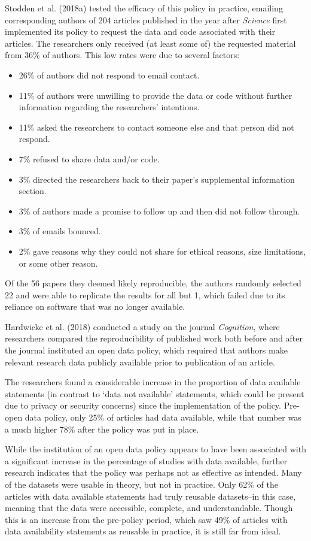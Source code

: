 \documentclass[12pt,twoside]{reedthesis}
\providecommand{\tightlist}{%
  \setlength{\itemsep}{0pt}\setlength{\parskip}{0pt}}
\begin{document}
Stodden et al. (2018a) tested the efficacy of this policy in practice, emailing corresponding authors of 204 articles published in the year after \emph{Science} first implemented its policy to request the data and code associated with their articles. The researchers only received (at least some of) the requested material from 36\% of authors. This low rates were due to several factors:
\begin{itemize}
\tightlist
\item
  26\% of authors did not respond to email contact.
\item
  11\% of authors were unwilling to provide the data or code without further information regarding the researchers' intentions.
\item
  11\% asked the researchers to contact someone else and that person did not respond.
\item
  7\% refused to share data and/or code.
\item
  3\% directed the researchers back to their paper's supplemental information section.
\item
  3\% of authors made a promise to follow up and then did not follow through.
\item
  3\% of emails bounced.
\item
  2\% gave reasons why they could not share for ethical reasons, size limitations, or some other reason.
\end{itemize}
Of the 56 papers they deemed likely reproducible, the authors randomly selected 22 and were able to replicate the results for all but 1, which failed due to its reliance on software that was no longer available.

Hardwicke et al. (2018) conducted a study on the journal \emph{Cognition}, where researchers compared the reproducibility of published work both before and after the journal instituted an open data policy, which required that authors make relevant research data publicly available prior to publication of an article.

The researchers found a considerable increase in the proportion of data available statements (in contrast to `data not available' statements, which could be present due to privacy or security concerns) since the implementation of the policy. Pre-open data policy, only 25\% of articles had data available, while that number was a much higher 78\% after the policy was put in place.

While the institution of an open data policy appears to have been associated with a significant increase in the percentage of studies with data available, further research indicates that the policy was perhaps not as effective as intended. Many of the datasets were usable in theory, but not in practice. Only 62\% of the articles with data available statements had truly reusable datasets--in this case, meaning that the data were accessible, complete, and understandable. Though this is an increase from the pre-policy period, which saw 49\% of articles with data availability statements as reusable in practice, it is still far from ideal.
\end{document}

